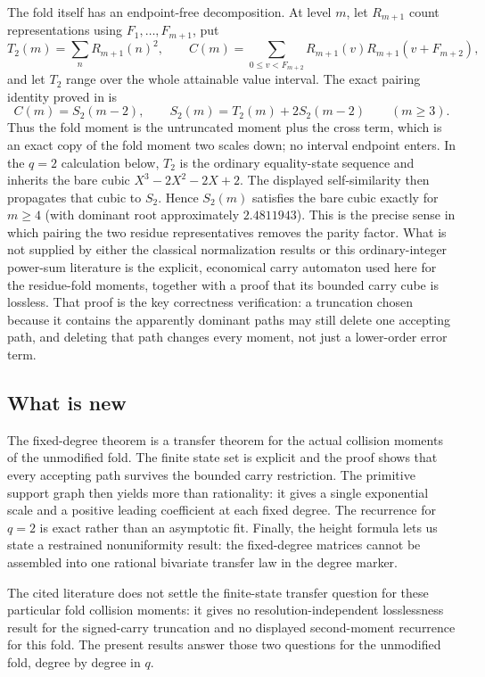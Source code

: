 The fold itself has an endpoint-free decomposition.  At level \(m\), let
\(R_{m+1}\) count representations using \(F_1,\ldots,F_{m+1}\), put
\[
 T_2(m)=\sum_n R_{m+1}(n)^2,\qquad
 C(m)=\sum_{0\le v<F_{m+2}}R_{m+1}(v)R_{m+1}(v+F_{m+2}),
\]
and let \(T_2\) range over the whole attainable value interval.  The exact
pairing identity proved in
 is
\[
 C(m)=S_2(m-2),\qquad
 S_2(m)=T_2(m)+2S_2(m-2)\qquad(m\ge3).
\]
Thus the fold moment is the untruncated moment plus the cross term, which is
an exact copy of the fold moment two scales down; no interval endpoint enters.
In the \(q=2\) calculation below, \(T_2\) is the ordinary equality-state
sequence and inherits the bare cubic \(X^3-2X^2-2X+2\).  The displayed
self-similarity then propagates that cubic to \(S_2\).  Hence \(S_2(m)\)
satisfies the bare cubic exactly for \(m\ge4\) (with dominant root
approximately \(2.4811943\)).  This is the precise sense in which pairing the
two residue representatives removes the parity factor.
What is not supplied by either the classical normalization results or this
ordinary-integer power-sum literature is the explicit, economical carry
automaton used here for the residue-fold moments, together with a proof that
its bounded carry cube is lossless.  That proof is the key correctness
verification: a
truncation chosen because it contains the apparently dominant paths may still
delete one accepting path, and deleting that path changes every moment, not
just a lower-order error term.

\subsection{What is new}
The fixed-degree theorem is a transfer theorem for the actual collision
moments of the unmodified fold.  The finite state set is explicit and the
proof shows that every accepting path survives the bounded carry restriction.
The primitive support graph then yields more than rationality: it gives a
single exponential scale and a positive leading coefficient at each fixed
degree.  The recurrence for \(q=2\) is exact rather than an asymptotic fit.
Finally, the height formula lets us state a restrained nonuniformity result:
the fixed-degree matrices cannot be assembled into one rational bivariate
transfer law in the degree marker.

The cited literature does not settle the finite-state transfer question for
these particular fold collision moments: it gives no resolution-independent
losslessness result for the signed-carry truncation and no displayed
second-moment recurrence for this fold.  The present results answer those two
questions for the unmodified fold, degree by degree in \(q\).

